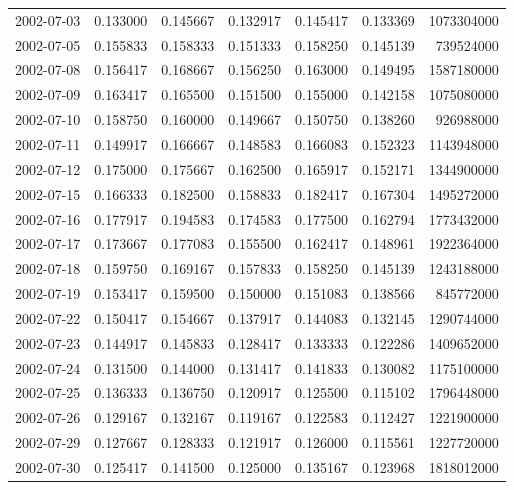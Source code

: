 \begin{tabular}{lrrrrrr}
2002-07-03 &    0.133000 &    0.145667 &    0.132917 &    0.145417 &    0.133369 &  1073304000 \\
2002-07-05 &    0.155833 &    0.158333 &    0.151333 &    0.158250 &    0.145139 &   739524000 \\
2002-07-08 &    0.156417 &    0.168667 &    0.156250 &    0.163000 &    0.149495 &  1587180000 \\
2002-07-09 &    0.163417 &    0.165500 &    0.151500 &    0.155000 &    0.142158 &  1075080000 \\
2002-07-10 &    0.158750 &    0.160000 &    0.149667 &    0.150750 &    0.138260 &   926988000 \\
2002-07-11 &    0.149917 &    0.166667 &    0.148583 &    0.166083 &    0.152323 &  1143948000 \\
2002-07-12 &    0.175000 &    0.175667 &    0.162500 &    0.165917 &    0.152171 &  1344900000 \\
2002-07-15 &    0.166333 &    0.182500 &    0.158833 &    0.182417 &    0.167304 &  1495272000 \\
2002-07-16 &    0.177917 &    0.194583 &    0.174583 &    0.177500 &    0.162794 &  1773432000 \\
2002-07-17 &    0.173667 &    0.177083 &    0.155500 &    0.162417 &    0.148961 &  1922364000 \\
2002-07-18 &    0.159750 &    0.169167 &    0.157833 &    0.158250 &    0.145139 &  1243188000 \\
2002-07-19 &    0.153417 &    0.159500 &    0.150000 &    0.151083 &    0.138566 &   845772000 \\
2002-07-22 &    0.150417 &    0.154667 &    0.137917 &    0.144083 &    0.132145 &  1290744000 \\
2002-07-23 &    0.144917 &    0.145833 &    0.128417 &    0.133333 &    0.122286 &  1409652000 \\
2002-07-24 &    0.131500 &    0.144000 &    0.131417 &    0.141833 &    0.130082 &  1175100000 \\
2002-07-25 &    0.136333 &    0.136750 &    0.120917 &    0.125500 &    0.115102 &  1796448000 \\
2002-07-26 &    0.129167 &    0.132167 &    0.119167 &    0.122583 &    0.112427 &  1221900000 \\
2002-07-29 &    0.127667 &    0.128333 &    0.121917 &    0.126000 &    0.115561 &  1227720000 \\
2002-07-30 &    0.125417 &    0.141500 &    0.125000 &    0.135167 &    0.123968 &  1818012000 \\

\end{tabular}
